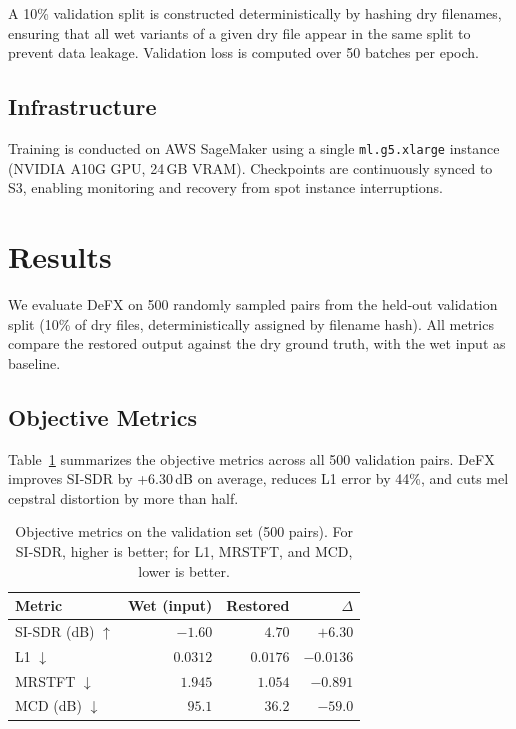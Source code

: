 \documentclass[11pt,twocolumn]{article}
\begin{document}
A 10\% validation split is constructed deterministically by hashing dry filenames, ensuring that all wet variants of a given dry file appear in the same split to prevent data leakage. Validation loss is computed over 50 batches per epoch.

\subsection{Infrastructure}

Training is conducted on AWS SageMaker using a single \texttt{ml.g5.xlarge} instance (NVIDIA A10G GPU, 24\,GB VRAM). Checkpoints are continuously synced to S3, enabling monitoring and recovery from spot instance interruptions.

\section{Results}

We evaluate DeFX on 500 randomly sampled pairs from the held-out validation split (10\% of dry files, deterministically assigned by filename hash). All metrics compare the restored output against the dry ground truth, with the wet input as baseline.

\subsection{Objective Metrics}

Table~\ref{tab:objective} summarizes the objective metrics across all 500 validation pairs. DeFX improves SI-SDR by +6.30\,dB on average, reduces L1 error by 44\%, and cuts mel cepstral distortion by more than half.

\begin{table}[t]
  \centering
  \caption{Objective metrics on the validation set (500 pairs). For SI-SDR, higher is better; for L1, MRSTFT, and MCD, lower is better.}
  \label{tab:objective}
  \begin{tabular}{@{}lrrr@{}}
    \toprule
    Metric & Wet (input) & Restored & $\Delta$ \\
    \midrule
    SI-SDR (dB) $\uparrow$ & $-1.60$ & $4.70$ & $+6.30$ \\
    L1 $\downarrow$ & $0.0312$ & $0.0176$ & $-0.0136$ \\
    MRSTFT $\downarrow$ & $1.945$ & $1.054$ & $-0.891$ \\
    MCD (dB) $\downarrow$ & $95.1$ & $36.2$ & $-59.0$ \\
    \bottomrule
  \end{tabular}
\end{table}
\end{document}
